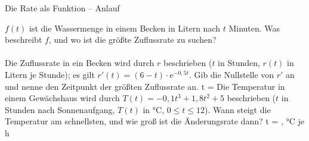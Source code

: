 \setcounter{aufgabe}{0}

\begin{aufgabe}{Die Rate als Funktion – Anlauf}
\begin{teile}
\teil $f(t)$ ist die Wassermenge in einem Becken in Litern nach $t$ Minuten. Was beschreibt $f$, und wo ist die größte Zuflussrate zu suchen? \\  \\ 
\teil Die Zuflussrate in ein Becken wird durch $r$ beschrieben ($t$ in Stunden, $r(t)$ in Litern je Stunde); es gilt $r'(t) = (6 - t) \cdot \mathrm{e}^{-0{,}5t}$. Gib die Nullstelle von $r'$ an und nenne den Zeitpunkt der größten Zuflussrate an. t = \leerfeld
\teil Die Temperatur in einem Gewächshaus wird durch $T(t) = -0{,}1t^3 + 1{,}8t^2 + 5$ beschrieben ($t$ in Stunden nach Sonnenaufgang, $T(t)$ in °C, $0 \le t \le 12$). Wann steigt die Temperatur am schnellsten, und wie groß ist die Änderungsrate dann? t = \leerfeld , \leerfeld °C je h
\end{teile}
\end{aufgabe}

